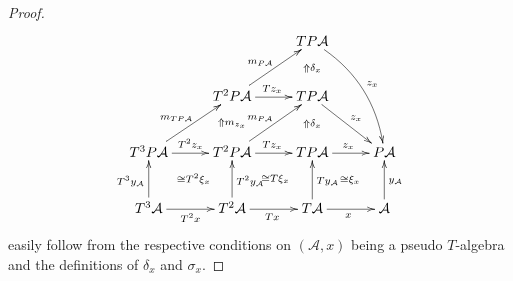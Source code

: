 \documentclass[a4paper,oneside,english]{amsart}
\numberwithin{equation}{section}
\numberwithin{figure}{section}
\theoremstyle{plain}
\theoremstyle{definition}
\theoremstyle{remark}
\theoremstyle{definition}
\theoremstyle{plain}
\theoremstyle{plain}
\theoremstyle{plain}
\begin{document}
\begin{proof}
\[
\xymatrix@=1em{ &  &  &  & TP\mathcal{A}\ar@/^{1pc}/[rdrddd]^{z_{x}}\\
\\
 &  & T^{2}P\mathcal{A}\ar[rr]^{Tz_{x}}\ar[rruu]^{m_{P\mathcal{A}}} &  & TP\mathcal{A}\ar[rddr]^{z_{x}}\ar@{}[uu]|-{\Uparrow\delta_{x}}\\
\\
T^{3}P\mathcal{A}\ar[rr]^{T^{2}z_{x}}\ar[rruu]^{m_{TP\mathcal{A}}} &  & T^{2}P\mathcal{A}\ar[rr]^{Tz_{x}}\ar[uurr]^{m_{P\mathcal{A}}}\ar@{}[uu]|-{\Uparrow m_{z_{x}}} &  & TP\mathcal{A}\ar[rr]^{z_{x}}\ar@{}[uu]|-{\Uparrow\delta_{x}} &  & P\mathcal{A}\\
\\
T^{3}\mathcal{A}\ar[rr]_{T^{2}x}\ar[uu]^{T^{3}y_{\mathcal{A}}}\ar@{}[rruu]|-{\cong T^{2}\xi_{x}} &  & T^{2}\mathcal{A}\ar[rr]_{Tx}\ar[uu]_{T^{2}y_{\mathcal{A}}}\ar@{}[rruu]|-{\cong T\xi_{x}} &  & T\mathcal{A}\ar[rr]_{x}\ar[uu]_{Ty_{\mathcal{A}}}\ar@{}[rruu]|-{\cong\xi_{x}} &  & \mathcal{A}\ar[uu]_{y_{\mathcal{A}}}
}
\]
easily follow from the respective conditions on $\left(\mathcal{A},x\right)$
being a pseudo $T$-algebra and the definitions of $\delta_{x}$ and
$\sigma_{x}$.


\end{proof}
\end{document}
